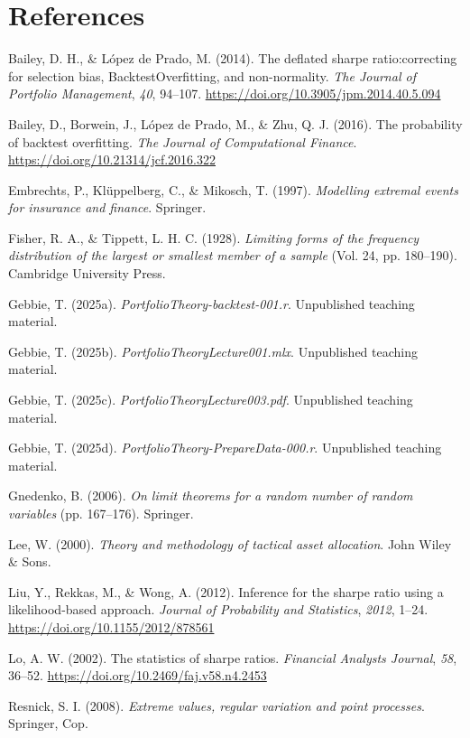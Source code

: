 \documentclass[
  12pt,
]{article}
\newlength{\cslhangindent}
\newenvironment{CSLReferences}[2] %
 {\begin{list}{}{%
  \setlength{\itemindent}{0pt}
  \setlength{\leftmargin}{0pt}
  \setlength{\parsep}{0pt}
  \ifodd #1
   \setlength{\leftmargin}{\cslhangindent}
   \setlength{\itemindent}{-1\cslhangindent}
  \fi
  \setlength{\itemsep}{#2\baselineskip}}}
 {\end{list}}
\begin{document}
\newpage

\section*{References}\label{references}

\label{refs}
\begin{CSLReferences}{1}{0}
Bailey, D. H., \& López de Prado, M. (2014). The deflated sharpe
ratio:correcting for selection bias, BacktestOverfitting, and
non-normality. \emph{The Journal of Portfolio Management}, \emph{40},
94--107. \url{https://doi.org/10.3905/jpm.2014.40.5.094}

Bailey, D., Borwein, J., López de Prado, M., \& Zhu, Q. J. (2016). The
probability of backtest overfitting. \emph{The Journal of Computational
Finance}. \url{https://doi.org/10.21314/jcf.2016.322}

Embrechts, P., Klüppelberg, C., \& Mikosch, T. (1997). \emph{Modelling
extremal events for insurance and finance}. Springer.

Fisher, R. A., \& Tippett, L. H. C. (1928). \emph{Limiting forms of the
frequency distribution of the largest or smallest member of a sample}
(Vol. 24, pp. 180--190). Cambridge University Press.

Gebbie, T. (2025a). \emph{PortfolioTheory-backtest-001.r}. Unpublished
teaching material.

Gebbie, T. (2025b). \emph{PortfolioTheoryLecture001.mlx}. Unpublished
teaching material.

Gebbie, T. (2025c). \emph{PortfolioTheoryLecture003.pdf}. Unpublished
teaching material.

Gebbie, T. (2025d). \emph{PortfolioTheory-PrepareData-000.r}.
Unpublished teaching material.

Gnedenko, B. (2006). \emph{On limit theorems for a random number of
random variables} (pp. 167--176). Springer.

Lee, W. (2000). \emph{Theory and methodology of tactical asset
allocation}. John Wiley \& Sons.

Liu, Y., Rekkas, M., \& Wong, A. (2012). Inference for the sharpe ratio
using a likelihood-based approach. \emph{Journal of Probability and
Statistics}, \emph{2012}, 1--24.
\url{https://doi.org/10.1155/2012/878561}

Lo, A. W. (2002). The statistics of sharpe ratios. \emph{Financial
Analysts Journal}, \emph{58}, 36--52.
\url{https://doi.org/10.2469/faj.v58.n4.2453}

Resnick, S. I. (2008). \emph{Extreme values, regular variation and point
processes}. Springer, Cop.

\end{CSLReferences}
\end{document}
